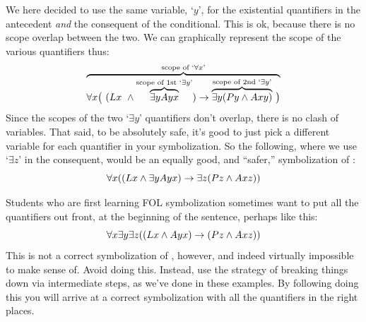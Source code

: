 We here decided to use the same variable, `$y$', for the existential quantifiers in the antecedent \emph{and} the consequent of the conditional. This is ok, because there is no scope overlap between the two. We can graphically represent the scope of the various quantifiers thus:
$$\overbrace{\forall x\bigl(\ (Lx \ \wedge \overbrace{\exists yAyx}^{\text{scope of 1st `}\exists y\text{'}}) \rightarrow \overbrace{\exists y(Py \wedge Axy)}^{\text{scope of 2nd `}\exists y\text{'}} \ \bigr)}^{\text{scope of `}\forall x\text{'}}$$
Since the scopes of the two `$\exists y$' quantifiers don't overlap, there is no clash of variables.   That said, to be absolutely safe, it's good to just pick a different variable for each quantifier in your symbolization.  So the following, where we use `$\exists z$' in the consequent, would be an equally good, and ``safer,'' symbolization of :$$\forall x((Lx \wedge \exists yAyx) \rightarrow \exists z(Pz \wedge Axz))$$

Students who are first learning FOL symbolization sometimes want to put all the quantifiers out front, at the beginning of the sentence, perhaps like this:
$$\forall x\exists y \exists z((Lx \wedge Ayx) \rightarrow (Pz \wedge Axz))$$
This is not a correct symbolization of , however, and indeed virtually impossible to make sense of.  Avoid doing this.  Instead, use the strategy of breaking things down via intermediate steps, as we've done in these examples.  By following doing this you will arrive at a correct symbolization with all the quantifiers in the right places.




